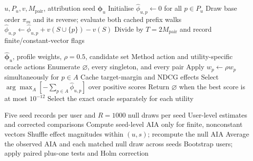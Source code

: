 \documentclass[pdflatex,sn-basic,Numbered]{sn-jnl}
\theoremstyle{thmstyleone}
\theoremstyle{thmstyletwo}
\theoremstyle{thmstylethree}
\begin{document}
\begin{algorithm}[t]
\caption{Paired Monte Carlo attribution}
\label{alg:shapley}
\begin{algorithmic}[1]
\Require $u,P_u,v,M_{\mathrm{pair}}$, attribution seed
\Ensure $\widehat{\boldsymbol\phi}_u$
\State Initialise $\hat\phi_{u,p}\gets0$ for all $p\in P_u$
\State Draw base order $\pi_m$ and its reverse; evaluate both cached prefix walks
\State $\hat\phi_{u,p}\gets\hat\phi_{u,p}+v(S\cup\{p\})-v(S)$
\EndFor
\EndFor
\State Divide by $T=2M_{\mathrm{pair}}$ and record finite/constant-vector flags
\end{algorithmic}
\end{algorithm}

\begin{algorithm}[t]
\caption{Signed action selection and exact budget-two oracle}
\label{alg:actions}
\begin{algorithmic}[1]
\Require $\hat{\boldsymbol\phi}_u$, profile weights, $\rho=0.5$, candidate set
\Ensure Method action and utility-specific oracle actions
\State Enumerate $\varnothing$, every singleton, and every pair
\State Apply $w_p\gets\rho w_p$ simultaneously for $p\in A$
\State Cache target-margin and NDCG effects
\EndFor
\State Select $\arg\max_A[-\sum_{p\in A}\hat\phi_{u,p}]$ over positive scores
\State Return $\varnothing$ when the best score is at most $10^{-12}$
\State Select the exact oracle separately for each utility
\end{algorithmic}
\end{algorithm}

\begin{algorithm}[t]
\caption{Distinct-user inference and AIA null}
\label{alg:inference}
\begin{algorithmic}[1]
\Require Five seed records per user and $R=1000$ null draws per seed
\Ensure User-level estimates and corrected comparisons
\State Compute seed-level AIA only for finite, nonconstant vectors
\State Shuffle effect magnitudes within $(u,s)$; recompute the null AIA
\EndFor
\EndFor
{}
\State Average the observed AIA and each matched null draw across seeds
\EndFor
\State Bootstrap users; apply paired plus-one tests and Holm correction
\end{algorithmic}
\end{algorithm}
\end{document}
